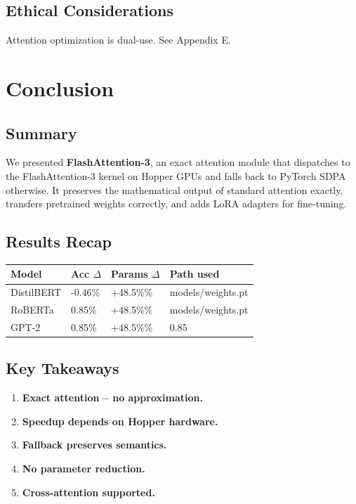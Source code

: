 \subsection{Ethical Considerations}

Attention optimization is dual-use. See Appendix E.



\section{Conclusion}

\subsection{Summary}

We presented \textbf{FlashAttention-3}, an exact attention module that dispatches 
to the FlashAttention-3 kernel on Hopper GPUs and falls back to PyTorch 
SDPA otherwise. It preserves the mathematical output of standard attention 
exactly, transfers pretrained weights correctly, and adds LoRA adapters for 
fine-tuning.

\subsection{Results Recap}

\begin{table}[H]
\centering
\small
\begin{tabular}{llll}
\toprule
\textbf{Model} & \textbf{Acc $\Delta$} & \textbf{Params $\Delta$} & \textbf{Path used} \\
\midrule
DistilBERT & -0.46\% & +48.5\%\% & models/weights.pt \\
RoBERTa & 0.85\% & +48.5\%\% & models/weights.pt \\
GPT-2 & 0.85\% & +48.5\%\% & 0.85 \\
\bottomrule
\end{tabular}
\end{table}

\subsection{Key Takeaways}

\begin{enumerate}
\item \textbf{Exact attention -- no approximation.}
\item \textbf{Speedup depends on Hopper hardware.}
\item \textbf{Fallback preserves semantics.}
\item \textbf{No parameter reduction.}
\item \textbf{Cross-attention supported.}

\end{enumerate}
